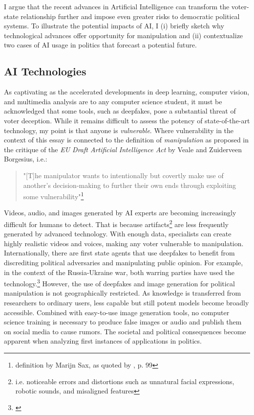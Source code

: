 \documentclass[wide]{adonis}
\begin{document}
        I argue that the recent advances in Artificial Intelligence can transform the voter-state relationship further and impose even greater risks to democratic political systems. To illustrate the potential impacts of AI, I (i) briefly sketch why technological advances offer opportunity for manipulation and (ii) contextualize two cases of AI usage in politics that forecast a potential future. \\ 
        \subsection{AI Technologies}
         As captivating as the accelerated developments in deep learning, computer vision, and multimedia analysis are to any computer science student, it must be acknowledged that some tools, such as deepfakes, pose a substantial threat of voter deception. While it remains difficult to assess the potency of state-of-the-art technology, my point is that anyone is \textit{vulnerable}. Where vulnerability in the context of this essay is connected to the definition of \textit{manipulation} as proposed in the critique of the \textit{EU Draft Artificial Intelligence Act} by Veale and Zuiderveen
Borgesius, i.e.: 
        \begin{quote}
                "[T]he manipulator wants to intentionally but covertly make use of another’s decision-making to further their own ends through exploiting some vulnerability"\footnote{definition by Marijn Sax, as quoted by \cite{veale2021}, p. 99 }
        \end{quote} 
        Videos, audio, and images generated by AI experts are becoming increasingly difficult for humans to detect. That is because artifacts\footnote{i.e. noticeable errors and distortions such as unnatural facial expressions, robotic sounds, and misaligned features} 
        are less frequently generated by advanced technology. With enough data, specialists can create highly realistic videos and voices, making any voter vulnerable to manipulation.\\
        Internationally, there are first state agents that use deepfakes to benefit from discrediting political adversaries and manipulating public opinion. For example, in the context of the Russia-Ukraine war, both warring parties have used the technology.\footnote{\cite{bbc-presidents-deepfake}} However, the use of deepfakes and image generation for political manipulation is not geographically restricted. As knowledge is transferred from researchers to ordinary users, less capable but still potent models become broadly accessible. Combined with easy-to-use image generation tools, no computer science training is necessary to produce false images or audio and publish them on social media to cause rumors. The societal and political consequences become apparent when analyzing first instances of applications in politics. 
\end{document}
